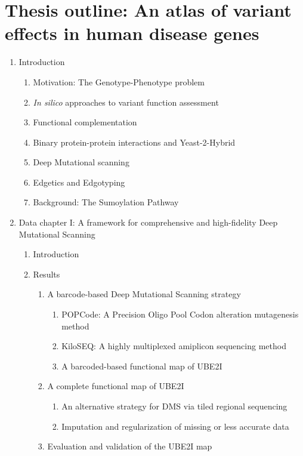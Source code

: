 \documentclass[12pt]{article}
\begin{document}
\section*{Thesis outline: An atlas of variant effects in human disease genes}
\begin{enumerate}
	\item Introduction
	\begin{enumerate}
		\item Motivation: The Genotype-Phenotype problem
		\item \textit{In silico} approaches to variant function assessment
		\item Functional complementation
		\item Binary protein-protein interactions and Yeast-2-Hybrid
		\item Deep Mutational scanning
		\item Edgetics and Edgotyping
		\item Background: The Sumoylation Pathway
	\end{enumerate}
	\item Data chapter I: A framework for comprehensive and high-fidelity Deep Mutational Scanning
	\begin{enumerate}
		\item Introduction
		\item Results
		\begin{enumerate}
			\item A barcode-based Deep Mutational Scanning strategy
			\begin{enumerate}
				\item POPCode: A Precision Oligo Pool Codon alteration mutagenesis method
				\item KiloSEQ: A highly multiplexed amiplicon sequencing method
				\item A barcoded-based functional map of UBE2I
			\end{enumerate}
			\item A complete functional map of UBE2I
			\begin{enumerate}
				\item An alternative strategy for DMS via tiled regional sequencing
				\item Imputation and regularization of missing or less accurate data
			\end{enumerate}
			\item Evaluation and validation of the UBE2I map

\end{enumerate}
\end{enumerate}
\end{enumerate}
\end{document}
